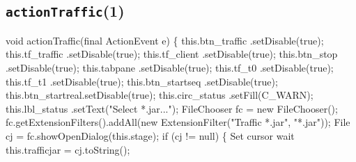 \subsection{\texttt{actionTraffic}(1)}
\nwenddocs{}\endmoddef{}
void actionTraffic(final ActionEvent e) \{
  this.btn_traffic  .setDisable(true);
  this.tf_traffic   .setDisable(true);
  this.tf_client    .setDisable(true);
  this.btn_stop     .setDisable(true);
  this.tabpane      .setDisable(true);
  this.tf_t0        .setDisable(true);
  this.tf_t1        .setDisable(true);
  this.btn_startseq .setDisable(true);
  this.btn_startreal.setDisable(true);
  this.circ_status  .setFill(C_WARN);
  this.lbl_status   .setText("Select *.jar...");
  FileChooser fc = new FileChooser();
  fc.getExtensionFilters().addAll(new ExtensionFilter("Traffic *.jar", "*.jar"));
  File cj = fc.showOpenDialog(this.stage);
  if (cj != null) \{
    \LA{}Set cursor wait~{\nwtagstyle{}}\RA{}
    this.trafficjar = cj.toString();

